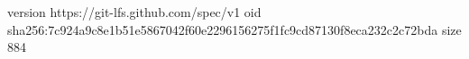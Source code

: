 version https://git-lfs.github.com/spec/v1
oid sha256:7c924a9c8e1b51e5867042f60e2296156275f1fc9cd87130f8eca232c2c72bda
size 884
